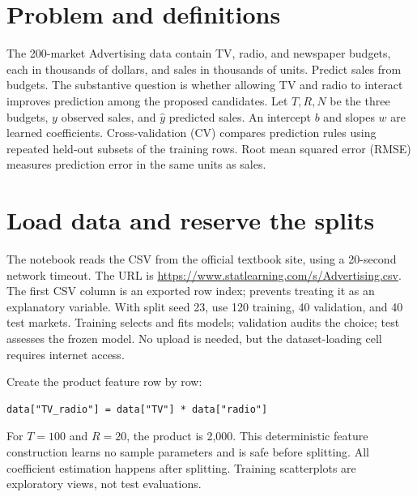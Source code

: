 


\section*{Problem and definitions}
The 200-market Advertising data contain TV, radio, and newspaper budgets, each in thousands of dollars, and sales in thousands of units. Predict sales from budgets. The substantive question is whether allowing TV and radio to interact improves prediction among the proposed candidates.
Let $T,R,N$ be the three budgets, $y$ observed sales, and $\hat y$ predicted sales. An intercept $b$ and slopes $w$ are learned coefficients. Cross-validation (CV) compares prediction rules using repeated held-out subsets of the training rows. Root mean squared error (RMSE) measures prediction error in the same units as sales.

\section{Load data and reserve the splits}
The notebook reads the CSV from the official textbook site, using a 20-second network timeout. The URL is \url{https://www.statlearning.com/s/Advertising.csv}. The first CSV column is an exported row index;  prevents treating it as an explanatory variable.
With split seed 23, use 120 training, 40 validation, and 40 test markets. Training selects and fits models; validation audits the choice; test assesses the frozen model. No upload is needed, but the dataset-loading cell requires internet access.

Create the product feature row by row:
\begin{lstlisting}
data["TV_radio"] = data["TV"] * data["radio"]
\end{lstlisting}
For $T=100$ and $R=20$, the product is 2,000. This deterministic feature construction learns no sample parameters and is safe before splitting. All coefficient estimation happens after splitting. Training scatterplots are exploratory views, not test evaluations.

